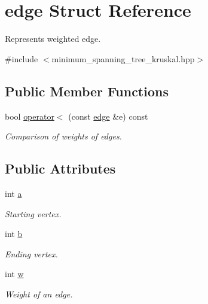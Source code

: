 \hypertarget{structedge}{\section{edge Struct Reference}
\label{structedge}
}


Represents weighted edge.  




{\ttfamily \#include $<$minimum\-\_\-spanning\-\_\-tree\-\_\-kruskal.\-hpp$>$}

\subsection*{Public Member Functions}
\begin{DoxyCompactItemize}
\item 
\hypertarget{structedge_a1be1d1dcbe96713a4dabdc83b9253b6d}{bool \hyperlink{structedge_a1be1d1dcbe96713a4dabdc83b9253b6d}{operator$<$} (const \hyperlink{structedge}{edge} \&e) const }\label{structedge_a1be1d1dcbe96713a4dabdc83b9253b6d}

\begin{DoxyCompactList}\small\item\em Comparison of weights of edges. \end{DoxyCompactList}\end{DoxyCompactItemize}
\subsection*{Public Attributes}
\begin{DoxyCompactItemize}
\item 
\hypertarget{structedge_a4094684ed54ca0e4ec3a9b251bfb2b0f}{int \hyperlink{structedge_a4094684ed54ca0e4ec3a9b251bfb2b0f}{a}}\label{structedge_a4094684ed54ca0e4ec3a9b251bfb2b0f}

\begin{DoxyCompactList}\small\item\em Starting vertex. \end{DoxyCompactList}\item 
\hypertarget{structedge_ae76a37f47c8fca97b8adfcb588130e0d}{int \hyperlink{structedge_ae76a37f47c8fca97b8adfcb588130e0d}{b}}\label{structedge_ae76a37f47c8fca97b8adfcb588130e0d}

\begin{DoxyCompactList}\small\item\em Ending vertex. \end{DoxyCompactList}\item 
\hypertarget{structedge_a2b4c1e3301482cde167eeb25135fa4ea}{int \hyperlink{structedge_a2b4c1e3301482cde167eeb25135fa4ea}{w}}\label{structedge_a2b4c1e3301482cde167eeb25135fa4ea}

\begin{DoxyCompactList}\small\item\em Weight of an edge. \end{DoxyCompactList}\end{DoxyCompactItemize}


